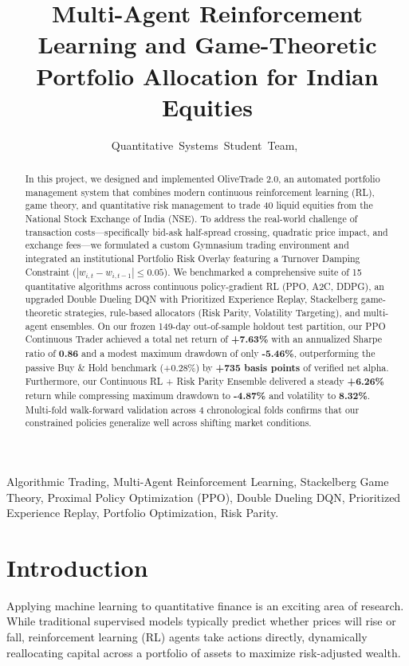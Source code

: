\documentclass[10pt,journal,compsoc]{IEEEtran}
\title{Multi-Agent Reinforcement Learning and Game-Theoretic Portfolio Allocation for Indian Equities}
\author{Quantitative~Systems~Student~Team,~\IEEEmembership{Department~of~Computer~Science~\&~Engineering}}
\begin{document}
\maketitle

\begin{abstract}
In this project, we designed and implemented OliveTrade 2.0, an automated portfolio management system that combines modern continuous reinforcement learning (RL), game theory, and quantitative risk management to trade 40 liquid equities from the National Stock Exchange of India (NSE). To address the real-world challenge of transaction costs—specifically bid-ask half-spread crossing, quadratic price impact, and exchange fees—we formulated a custom Gymnasium trading environment and integrated an institutional Portfolio Risk Overlay featuring a Turnover Damping Constraint ($|w_{i,t} - w_{i,t-1}| \le 0.05$). We benchmarked a comprehensive suite of 15 quantitative algorithms across continuous policy-gradient RL (PPO, A2C, DDPG), an upgraded Double Dueling DQN with Prioritized Experience Replay, Stackelberg game-theoretic strategies, rule-based allocators (Risk Parity, Volatility Targeting), and multi-agent ensembles. On our frozen 149-day out-of-sample holdout test partition, our PPO Continuous Trader achieved a total net return of \textbf{+7.63\%} with an annualized Sharpe ratio of \textbf{0.86} and a modest maximum drawdown of only \textbf{-5.46\%}, outperforming the passive Buy \& Hold benchmark (+0.28\%) by \textbf{+735 basis points} of verified net alpha. Furthermore, our Continuous RL + Risk Parity Ensemble delivered a steady \textbf{+6.26\%} return while compressing maximum drawdown to \textbf{-4.87\%} and volatility to \textbf{8.32\%}. Multi-fold walk-forward validation across 4 chronological folds confirms that our constrained policies generalize well across shifting market conditions.
\end{abstract}

\begin{IEEEkeywords}
Algorithmic Trading, Multi-Agent Reinforcement Learning, Stackelberg Game Theory, Proximal Policy Optimization (PPO), Double Dueling DQN, Prioritized Experience Replay, Portfolio Optimization, Risk Parity.
\end{IEEEkeywords}

\section{Introduction}
Applying machine learning to quantitative finance is an exciting area of research. While traditional supervised models typically predict whether prices will rise or fall, reinforcement learning (RL) agents take actions directly, dynamically reallocating capital across a portfolio of assets to maximize risk-adjusted wealth.
\end{document}
